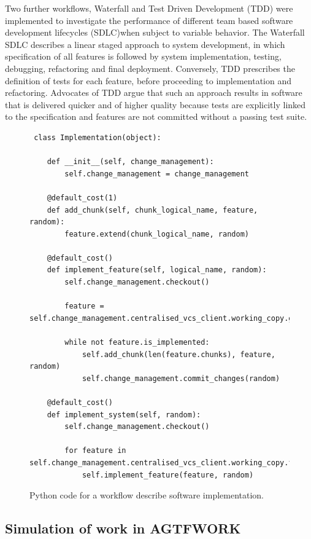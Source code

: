 \documentclass{llncs}
\begin{document}
Two further workflows, Waterfall and Test Driven Development (TDD) were implemented to investigate the performance of
different team based software development lifecycles (SDLC)when subject to variable behavior.  The Waterfall SDLC
\cite{benington83production} describes a linear staged approach to system development, in which specification of all
features is followed by system implementation, testing, debugging, refactoring and final deployment.  Conversely, TDD
\cite{beck02test} prescribes the definition of tests for each feature, before proceeding to implementation and
refactoring.  Advocates of TDD argue that such an approach results in software that is delivered quicker and of higher
quality because tests are explicitly linked to the specification and features are not committed without a passing test
suite.

\begin{figure}
  \centering
\begin{lstlisting}
 class Implementation(object):

    def __init__(self, change_management):
        self.change_management = change_management

    @default_cost(1)
    def add_chunk(self, chunk_logical_name, feature, random):
        feature.extend(chunk_logical_name, random)

    @default_cost()
    def implement_feature(self, logical_name, random):
        self.change_management.checkout()

        feature = self.change_management.centralised_vcs_client.working_copy.get_feature(logical_name)

        while not feature.is_implemented:
            self.add_chunk(len(feature.chunks), feature, random)
            self.change_management.commit_changes(random)

    @default_cost()
    def implement_system(self, random):
        self.change_management.checkout()

        for feature in self.change_management.centralised_vcs_client.working_copy.features:
            self.implement_feature(feature, random)

\end{lstlisting}
  \caption{Python code for a workflow describe software implementation.}
  \label{fig:implementation-workflow}

\end{figure}

\subsection{Simulation of work in AGTFWORK}
\end{document}
